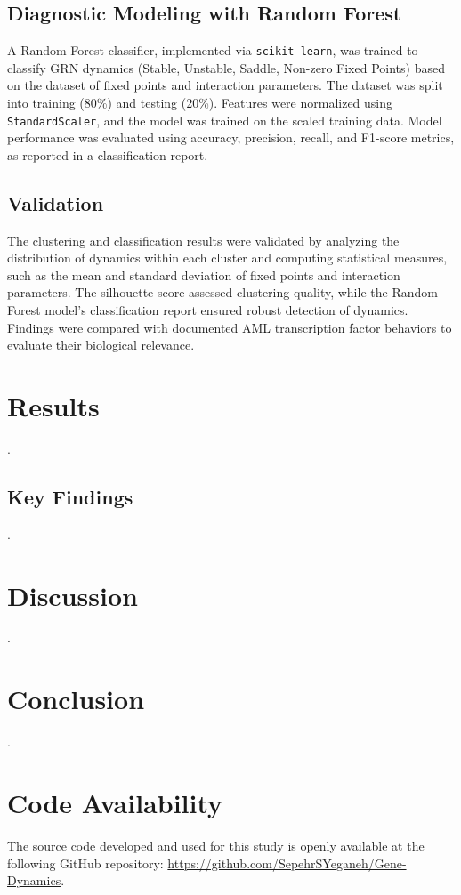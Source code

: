 \documentclass[a4paper,12pt]{article}
\begin{document}
\subsection{Diagnostic Modeling with Random Forest}
\label{subsec:diagnostic_modeling}
A Random Forest classifier, implemented via \texttt{scikit-learn}, was trained to classify GRN dynamics (Stable, Unstable, Saddle, Non-zero Fixed Points) based on the dataset of fixed points and interaction parameters. The dataset was split into training (80\%) and testing (20\%). Features were normalized using \texttt{StandardScaler}, and the model was trained on the scaled training data. Model performance was evaluated using accuracy, precision, recall, and F1-score metrics, as reported in a classification report.

\subsection{Validation}
\label{subsec:validation}
The clustering and classification results were validated by analyzing the distribution of dynamics within each cluster and computing statistical measures, such as the mean and standard deviation of fixed points and interaction parameters. The silhouette score assessed clustering quality, while the Random Forest model’s classification report ensured robust detection of dynamics. Findings were compared with documented AML transcription factor behaviors to evaluate their biological relevance.


\section{Results}
\label{sec:results}
.

\subsection{Key Findings}
.


\section{Discussion}
.


\section{Conclusion}
\label{sec:conclusion}
.


\section{Code Availability}
\label{sec:code_availability}
The source code developed and used for this study is openly available at the following GitHub repository:  
\url{https://github.com/SepehrSYeganeh/Gene-Dynamics}.
\end{document}
